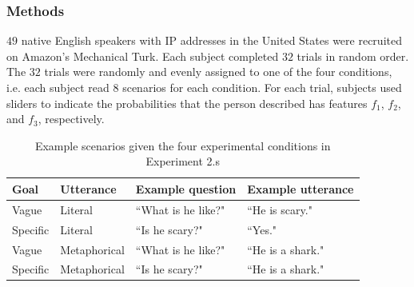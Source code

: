 \documentclass[10pt,letterpaper]{article}
\begin{document}
\subsubsection{Methods}
$49$ native English speakers with IP addresses in the United States were recruited on Amazon's Mechanical Turk. Each subject completed $32$ trials in random order. The $32$ trials were randomly and evenly assigned to one of the four conditions, i.e. each subject read $8$ scenarios for each condition. For each trial, subjects used sliders to indicate the probabilities that the person described has features $f_1$, $f_2$, and $f_3$, respectively.

\begin{table}
\tabcolsep=0.2cm
\small
\begin{tabular}{llll}
\toprule
Goal & Utterance & Example question & Example utterance \\
\midrule
Vague & Literal & ``What is he like?" & ``He is scary." \\
Specific  & Literal & ``Is he scary?" & ``Yes." \\
Vague & Metaphorical & ``What is he like?" & ``He is a shark." \\
Specific & Metaphorical & ``Is he scary?" & ``He is a shark." \\
\bottomrule
\end{tabular}
\caption{Example scenarios given the four experimental conditions in Experiment 2.s}
\end{table}
\end{document}
